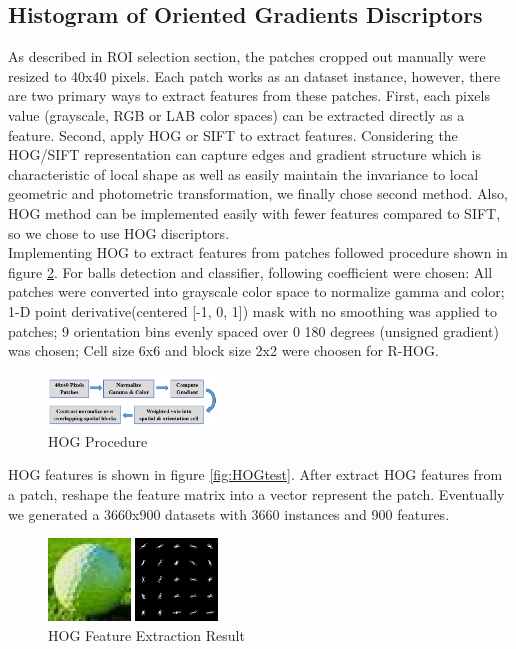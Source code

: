 \documentclass{article}
\begin{document}
\subsection{Histogram of Oriented Gradients Discriptors}
As described in ROI selection section, the patches cropped out manually were resized to 40x40 pixels. Each patch works as an dataset instance, however, there are two primary ways to extract features from these patches. First, each pixels value (grayscale, RGB or LAB color spaces) can be extracted directly as a feature. Second, apply HOG or SIFT to extract features. Considering the HOG/SIFT representation can capture edges and gradient structure which is characteristic of local shape as well as easily maintain the invariance to local geometric and photometric transformation, we finally chose second method. Also, HOG method can be implemented easily with fewer features compared to SIFT, so we chose to use HOG discriptors.\\  

Implementing HOG to extract features from patches followed procedure shown in figure \ref{fig:HOG}. For balls detection and classifier, following coefficient were chosen: All patches were converted into grayscale color space to normalize gamma and color; 1-D point derivative(centered [-1, 0, 1]) mask with no smoothing was applied to patches; 9 orientation bins evenly spaced over 0
180 degrees (unsigned gradient) was chosen; Cell size 6x6 and block size 2x2 were choosen for R-HOG.  
\begin{figure}[htp]
\centering
\includegraphics[width=0.4\textwidth]{HOG.jpg}
\caption{HOG Procedure}
\label{fig:HOG}
\end{figure}

HOG features is shown in figure \ref{fig:HOGtest}. After extract HOG features from a patch, reshape the feature matrix into a vector represent the patch. Eventually we generated a 3660x900 datasets with 3660 instances and 900 features. 

\begin{figure}[htp]
\centering
\includegraphics[width=0.4\textwidth]{HOGtest.jpg}
\caption{HOG Feature Extraction Result}
\label{fig:HOG}
\end{figure}
\end{document}

